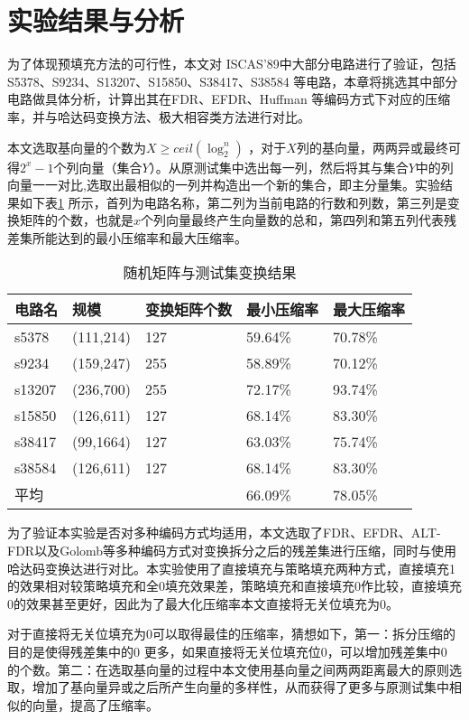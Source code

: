 \section{实验结果与分析}

为了体现预填充方法的可行性，本文对 ISCAS’89\cite{71}中大部分电路进行了验证，包括S5378、S9234、S13207、S15850、S38417、S38584 等电路，本章将挑选其中部分电路做具体分析，计算出其在FDR、EFDR、Huffman 等编码方式下对应的压缩率，并与哈达码变换方法、极大相容类方法进行对比。

本文选取基向量的个数为$X\ge ceil(\log_2^n⁡)$ ，对于$X$列的基向量，两两异或最终可得$2^x-1$个列向量（集合$Y$）。从原测试集中选出每一列，然后将其与集合$Y$中的列向量一一对比,选取出最相似的一列并构造出一个新的集合，即主分量集。实验结果如下表\ref{mtabl1} 所示，首列为电路名称，第二列为当前电路的行数和列数，第三列是变换矩阵的个数，也就是$x$个列向量最终产生向量数的总和，第四列和第五列代表残差集所能达到的最小压缩率和最大压缩率。

\begin{table}[H]
\centering
\caption{随机矩阵与测试集变换结果}\label{mtabl1}
\begin{tabular}{p{2.2cm}p{2.7cm}<{\centering}p{3.3cm}<{\centering}p{2.7cm}<{\centering}p{2.7cm}<{\centering}}
\toprule
\textbf{电路名}&	\textbf{规模}&     \textbf{变换矩阵个数}&   \textbf{最小压缩率}&   \textbf{最大压缩率}\\
\midrule
s5378& (111,214)& 127& 59.64\%& 70.78\%\\
s9234& (159,247)& 255& 58.89\%& 70.12\%\\
s13207& (236,700)& 255& 72.17\%& 93.74\%\\
s15850& (126,611)& 127& 68.14\%& 83.30\%\\
s38417& (99,1664)& 127& 63.03\%& 75.74\%\\
s38584& (126,611)& 127& 68.14\%& 83.30\%\\
平均&        &      &   66.09\%& 78.05\%\\
\bottomrule
\end{tabular}
\end{table}

为了验证本实验是否对多种编码方式均适用，本文选取了FDR、EFDR、ALT-FDR以及Golomb等多种编码方式对变换拆分之后的残差集进行压缩，同时与使用哈达码变换达进行对比。本实验使用了直接填充与策略填充两种方式，直接填充1的效果相对较策略填充和全0填充效果差，策略填充和直接填充0作比较，直接填充0的效果甚至更好，因此为了最大化压缩率本文直接将无关位填充为0。

对于直接将无关位填充为0可以取得最佳的压缩率，猜想如下，第一：拆分压缩的目的是使得残差集中的0 更多，如果直接将无关位填充位0，可以增加残差集中0 的个数。第二：在选取基向量的过程中本文使用基向量之间两两距离最大的原则选取，增加了基向量异或之后所产生向量的多样性，从而获得了更多与原测试集中相似的向量，提高了压缩率。

